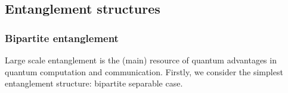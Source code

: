 \documentclass[
10pt,
aps,
pra,
linenumbers,
floatfix,
]{revtex4-2}
\theoremstyle{plain}
\theoremstyle{definition}
\newtheorem{definition}{Definition}
\newcommand{\dm}{\rho}
\begin{document}
\subsection{Entanglement structures}

\subsubsection{Bipartite entanglement}
Large scale entanglement is the (main) resource of quantum advantages in quantum computation and communication.
Firstly, we consider the simplest entanglement structure: bipartite separable case.
\end{document}
